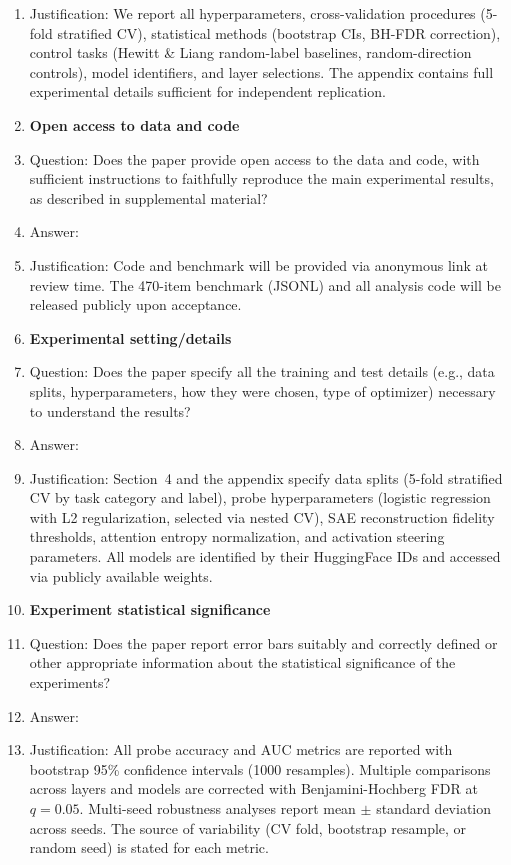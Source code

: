 \begin{enumerate}
    \item[] Justification: We report all hyperparameters, cross-validation procedures (5-fold stratified CV), statistical methods (bootstrap CIs, BH-FDR correction), control tasks (Hewitt \& Liang random-label baselines, random-direction controls), model identifiers, and layer selections. The appendix contains full experimental details sufficient for independent replication.
\item {\bf Open access to data and code}
    \item[] Question: Does the paper provide open access to the data and code, with sufficient instructions to faithfully reproduce the main experimental results, as described in supplemental material?
    \item[] Answer: \answerYes{}
    \item[] Justification: Code and benchmark will be provided via anonymous link at review time. The 470-item benchmark (JSONL) and all analysis code will be released publicly upon acceptance.
\item {\bf Experimental setting/details}
    \item[] Question: Does the paper specify all the training and test details (e.g., data splits, hyperparameters, how they were chosen, type of optimizer) necessary to understand the results?
    \item[] Answer: \answerYes{}
    \item[] Justification: Section~4 and the appendix specify data splits (5-fold stratified CV by task category and label), probe hyperparameters (logistic regression with L2 regularization, selected via nested CV), SAE reconstruction fidelity thresholds, attention entropy normalization, and activation steering parameters. All models are identified by their HuggingFace IDs and accessed via publicly available weights.
\item {\bf Experiment statistical significance}
    \item[] Question: Does the paper report error bars suitably and correctly defined or other appropriate information about the statistical significance of the experiments?
    \item[] Answer: \answerYes{}
    \item[] Justification: All probe accuracy and AUC metrics are reported with bootstrap 95\% confidence intervals (1000 resamples). Multiple comparisons across layers and models are corrected with Benjamini-Hochberg FDR at $q=0.05$. Multi-seed robustness analyses report mean $\pm$ standard deviation across seeds. The source of variability (CV fold, bootstrap resample, or random seed) is stated for each metric.

\end{enumerate}
